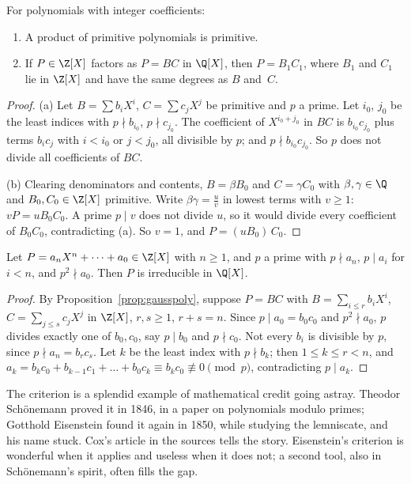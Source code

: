 \begin{proposition}\label{prop:gausspoly}
For polynomials with integer coefficients:
\begin{enumerate}[label=(\alph*)]
\item A product of primitive polynomials is primitive.
\item If $P\in\Z[X]$ factors as $P=BC$ in $\Q[X]$, then $P=B_1C_1$, where $B_1$ and $C_1$ lie in $\Z[X]$ and have the same degrees as $B$ and~$C$.
\end{enumerate}
\end{proposition}
\begin{proof}
(a) Let $B=\sum b_iX^i$, $C=\sum c_jX^j$ be primitive and $p$ a prime. Let $i_0$, $j_0$ be the least indices with $p\nmid b_{i_0}$, $p\nmid c_{j_0}$. The coefficient of $X^{i_0+j_0}$ in $BC$ is $b_{i_0}c_{j_0}$ plus terms $b_ic_j$ with $i<i_0$ or $j<j_0$, all divisible by $p$; and $p\nmid b_{i_0}c_{j_0}$. So $p$ does not divide all coefficients of $BC$.

(b) Clearing denominators and contents, $B=\beta B_0$ and $C=\gamma C_0$ with $\beta,\gamma\in\Q$ and $B_0,C_0\in\Z[X]$ primitive. Write $\beta\gamma=\frac uv$ in lowest terms with $v\ge1$: $vP=uB_0C_0$. A prime $p\mid v$ does not divide $u$, so it would divide every coefficient of $B_0C_0$, contradicting (a). So $v=1$, and $P=(uB_0)\,C_0$.
\end{proof}

\begin{theorem}\label{thm:eisenstein}
Let $P=a_nX^n+\dots+a_0\in\Z[X]$ with $n\ge1$, and $p$ a prime with $p\nmid a_n$, $p\mid a_i$ for $i<n$, and $p^2\nmid a_0$. Then $P$ is irreducible in $\Q[X]$.
\end{theorem}
\begin{proof}
By Proposition~\ref{prop:gausspoly}, suppose $P=BC$ with $B=\sum_{i\le r}b_iX^i$, $C=\sum_{j\le s}c_jX^j$ in $\Z[X]$, $r,s\ge1$, $r+s=n$. Since $p\mid a_0=b_0c_0$ and $p^2\nmid a_0$, $p$ divides exactly one of $b_0,c_0$, say $p\mid b_0$ and $p\nmid c_0$. Not every $b_i$ is divisible by $p$, since $p\nmid a_n=b_rc_s$. Let $k$ be the least index with $p\nmid b_k$; then $1\le k\le r<n$, and
$a_k=b_kc_0+b_{k-1}c_1+\dots+b_0c_k\equiv b_kc_0\not\equiv0\pmod p$, contradicting $p\mid a_k$.
\end{proof}

The criterion is a splendid example of mathematical credit going astray. Theodor Sch\"onemann proved it in 1846, in a paper on polynomials modulo
primes; Gotthold Eisenstein found it again in 1850, while studying the lemniscate, and his name stuck. Cox's article in the sources tells the story.
Eisenstein's criterion is wonderful when it applies and useless when it does not; a second tool, also in Sch\"onemann's spirit, often fills the gap.

